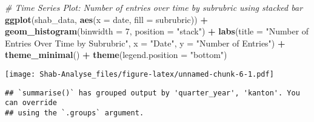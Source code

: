 \documentclass[
]{article}
\newenvironment{Shaded}{\begin{snugshade}}{\end{snugshade}}
\newcommand{\AttributeTok}[1]{\textcolor[rgb]{0.13,0.29,0.53}{#1}}
\newcommand{\CommentTok}[1]{\textcolor[rgb]{0.56,0.35,0.01}{\textit{#1}}}
\newcommand{\DecValTok}[1]{\textcolor[rgb]{0.00,0.00,0.81}{#1}}
\newcommand{\FunctionTok}[1]{\textcolor[rgb]{0.13,0.29,0.53}{\textbf{#1}}}
\newcommand{\NormalTok}[1]{#1}
\newcommand{\OtherTok}[1]{\textcolor[rgb]{0.56,0.35,0.01}{#1}}
\newcommand{\SpecialCharTok}[1]{\textcolor[rgb]{0.81,0.36,0.00}{\textbf{#1}}}
\newcommand{\StringTok}[1]{\textcolor[rgb]{0.31,0.60,0.02}{#1}}
\begin{document}
\begin{Shaded}
\begin{Highlighting}[]
\CommentTok{\# Time Series Plot: Number of entries over time by subrubric using stacked bar}
\FunctionTok{ggplot}\NormalTok{(shab\_data, }\FunctionTok{aes}\NormalTok{(}\AttributeTok{x =}\NormalTok{ date, }\AttributeTok{fill =}\NormalTok{ subrubric)) }\SpecialCharTok{+}
  \FunctionTok{geom\_histogram}\NormalTok{(}\AttributeTok{binwidth =} \DecValTok{7}\NormalTok{, }\AttributeTok{position =} \StringTok{"stack"}\NormalTok{) }\SpecialCharTok{+}
  \FunctionTok{labs}\NormalTok{(}\AttributeTok{title =} \StringTok{"Number of Entries Over Time by Subrubric"}\NormalTok{, }\AttributeTok{x =} \StringTok{"Date"}\NormalTok{, }\AttributeTok{y =} \StringTok{"Number of Entries"}\NormalTok{) }\SpecialCharTok{+}
  \FunctionTok{theme\_minimal}\NormalTok{() }\SpecialCharTok{+}
  \FunctionTok{theme}\NormalTok{(}\AttributeTok{legend.position =} \StringTok{"bottom"}\NormalTok{)}
\end{Highlighting}
\end{Shaded}

\texttt{[image: Shab-Analyse\_files/figure-latex/unnamed-chunk-6-1.pdf]}

\begin{Shaded}
\end{Shaded}

\begin{verbatim}
## `summarise()` has grouped output by 'quarter_year', 'kanton'. You can override
## using the `.groups` argument.
\end{verbatim}
\end{document}
